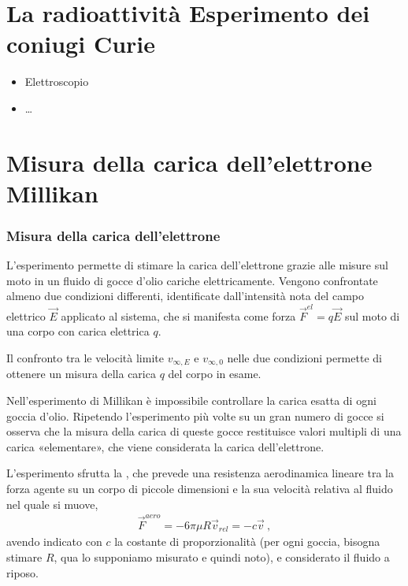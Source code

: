 \documentclass[letterpaper,10pt,italian]{jupyterBook}
\begin{document}
\section{La radioattività \sphinxhyphen{} Esperimento dei coniugi Curie}
\label{\detokenize{ch/modern/experiments:la-radioattivita-esperimento-dei-coniugi-curie}}\begin{itemize}
\item {} 
\sphinxAtStartPar
Elettroscopio {\hyperref[\detokenize{ch/electromagnetism/thermoelectric-effects:physics-hs-modern-intro-experiences-piezoel}]{}}

\item {} 
\sphinxAtStartPar
…

\end{itemize}


\section{Misura della carica dell’elettrone \sphinxhyphen{} Millikan}
\label{\detokenize{ch/modern/experiments:misura-della-carica-dell-elettrone-millikan}}\subsubsection*{Misura della carica dell’elettrone}

\sphinxAtStartPar
L’esperimento permette di stimare la carica dell’elettrone grazie alle misure sul moto in un fluido di gocce d’olio cariche elettricamente. Vengono confrontate almeno due condizioni differenti, identificate dall’intensità nota del campo elettrico \(\vec{E}\) applicato al sistema, che si manifesta come forza  \(\vec{F}^{el} = q \vec{E}\) sul moto di una corpo con carica elettrica \(q\).

\sphinxAtStartPar
Il confronto tra le velocità limite \(v_{\infty,E}\) e \(v_{\infty,0}\) nelle due condizioni permette di ottenere un misura della carica \(q\) del corpo in esame.

\sphinxAtStartPar
Nell’esperimento di Millikan è impossibile controllare la carica esatta di ogni goccia d’olio. Ripetendo l’esperimento più volte su un gran numero di gocce si osserva che la misura della carica di queste gocce restituisce valori multipli di una carica «elementare», che viene considerata la carica dell’elettrone.

\sphinxAtStartPar
L’esperimento sfrutta la {\hyperref[\detokenize{ch/continuum/fluids:fluids-dynamics-stokes}]{}}, che prevede una resistenza aerodinamica lineare tra la forza agente su un corpo di piccole dimensioni e la sua velocità relativa al fluido nel quale si muove,
\begin{equation*}
\begin{split}\vec{F}^{aero} = - 6 \pi \mu R \vec{v}_{rel} = - c \vec{v} \ ,\end{split}
\end{equation*}
\sphinxAtStartPar
avendo indicato con \(c\) la costante di proporzionalità (per ogni goccia, bisogna stimare \(R\), qua lo supponiamo misurato e quindi noto), e considerato il fluido a riposo.
\end{document}
